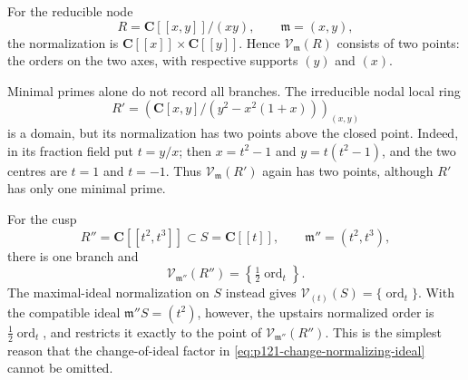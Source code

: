 \begin{example}
\label{ex:p121-node-cusp-normalized-links}
For the reducible node
\[
 R=\mathbf C[[x,y]]/(xy),
 \qquad \mathfrak m=(x,y),
\]
the normalization is \(\mathbf C[[x]]\times\mathbf C[[y]]\).  Hence
\(\mathcal V_{\mathfrak m}(R)\) consists of two points: the orders on the
two axes, with respective supports \((y)\) and \((x)\).

Minimal primes alone do not record all branches.  The irreducible nodal
local ring
\[
 R'=\left(\mathbf C[x,y]/(y^2-x^2(1+x))\right)_{(x,y)}
\]
is a domain, but its normalization has two points above the closed point.
Indeed, in its fraction field put \(t=y/x\); then
\(x=t^2-1\) and \(y=t(t^2-1)\), and the two centres are \(t=1\) and
\(t=-1\).  Thus \(\mathcal V_{\mathfrak m}(R')\) again has two points,
although \(R'\) has only one minimal prime.

For the cusp
\[
 R''=\mathbf C[[t^2,t^3]]\subset S=\mathbf C[[t]],
 \qquad \mathfrak m''=(t^2,t^3),
\]
there is one branch and
\[
                 \mathcal V_{\mathfrak m''}(R'')
                    =\left\{\tfrac12\operatorname{ord}_t\right\}.
\]
The maximal-ideal normalization on \(S\) instead gives
\(\mathcal V_{(t)}(S)=\{\operatorname{ord}_t\}\).  With the compatible
ideal \(\mathfrak m''S=(t^2)\), however, the upstairs normalized order is
\(\tfrac12\operatorname{ord}_t\), and
 restricts it exactly to the
point of \(\mathcal V_{\mathfrak m''}(R'')\).  This is the simplest reason
that the change-of-ideal factor in
\eqref{eq:p121-change-normalizing-ideal} cannot be omitted.
\end{example}
